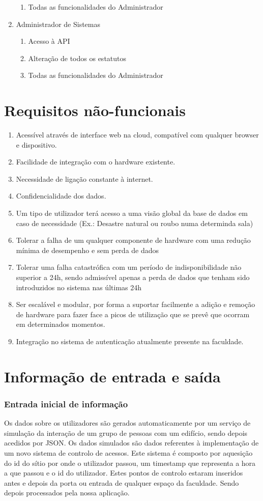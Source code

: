 \documentclass[a4paper]{report}
\begin{document}
\begin{enumerate}
\begin{enumerate}
    \item Todas as funcionalidades do Administrador
	\end{enumerate}
\item Administrador de Sistemas
	\begin{enumerate}
    \item Acesso à API
    \item Alteração de todos os estatutos
    \item Todas as funcionalidades do Administrador
    \end{enumerate}
\end{enumerate}
\section{Requisitos não-funcionais}
\begin{enumerate}
\item Acessível através de interface web na cloud, compatível com qualquer browser e dispositivo.
\item Facilidade de integração com o hardware existente.
\item Necessidade de ligação constante à internet.
\item Confidencialidade dos dados.
\item Um tipo de utilizador terá acesso a uma visão global da base de dados em caso de necessidade (Ex.: Desastre natural ou roubo numa determinda sala)
\item Tolerar a falha de um qualquer componente de hardware com uma redução mínima de desempenho e sem perda de dados
\item Tolerar uma falha catastrófica com um período de indisponibilidade não superior a 24h, sendo admissível apenas a perda de dados que tenham sido introduzidos no sistema nas últimas 24h
\item Ser escalável e modular, por forma a suportar facilmente a adição e remoção de hardware para fazer face a picos de utilização que se prevê que ocorram em determinados momentos.
\item Integração no sistema de autenticação atualmente presente na faculdade.
\end{enumerate}
\section{Informação de entrada e saída}
\subsubsection*{Entrada inicial de informação}
    Os dados sobre os utilizadores são gerados automaticamente por um serviço de simulação da interação de um grupo de pessoas com um edifício, sendo depois acedidos por JSON.
	Os dados simulados são dados referentes à implementação de um novo sistema de controlo de acessos. Este sistema é composto por aquesição do id do sítio por onde o utilizador passou, um timestamp que representa a hora a que passou e o id do utilizador. Estes pontos de controlo estaram inseridos antes e depois da porta ou entrada de qualquer espaço da faculdade. Sendo depois processados pela nossa aplicação. 
\end{document}
